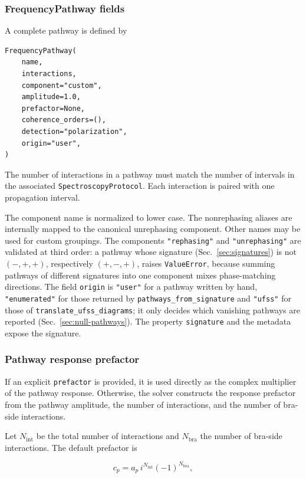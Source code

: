 \documentclass[11pt]{article}
\begin{document}
\subsubsection{FrequencyPathway fields}

A complete pathway is defined by

\begin{verbatim}
FrequencyPathway(
    name,
    interactions,
    component="custom",
    amplitude=1.0,
    prefactor=None,
    coherence_orders=(),
    detection="polarization",
    origin="user",
)
\end{verbatim}

The number of interactions in a pathway must match the number of intervals in the associated \texttt{SpectroscopyProtocol}. Each interaction is paired with one propagation interval.

The component name is normalized to lower case. The nonrephasing aliases are internally mapped to the canonical unrephasing component. Other names may be used for custom groupings. The components \texttt{"rephasing"} and \texttt{"unrephasing"} are validated at third order: a pathway whose signature (Sec.~\ref{sec:signatures}) is not $(-,+,+)$, respectively $(+,-,+)$, raises \texttt{ValueError}, because summing pathways of different signatures into one component mixes phase-matching directions. The field \texttt{origin} is \texttt{"user"} for a pathway written by hand, \texttt{"enumerated"} for those returned by \texttt{pathways\_from\_signature} and \texttt{"ufss"} for those of \texttt{translate\_ufss\_diagrams}; it only decides which vanishing pathways are reported (Sec.~\ref{sec:null-pathways}). The property \texttt{signature} and the metadata expose the signature.


\subsubsection{Pathway response prefactor}

If an explicit \texttt{prefactor} is provided, it is used directly as the complex multiplier of the pathway response. Otherwise, the solver constructs the response prefactor from the pathway amplitude, the number of interactions, and the number of bra-side interactions.

Let \(N_{\mathrm{int}}\) be the total number of interactions and \(N_{\mathrm{bra}}\) the number of bra-side interactions. The default
prefactor is

\begin{equation}
c_p = a_p\, i^{N_{\mathrm{int}}} (-1)^{N_{\mathrm{bra}}},
\end{equation}
\end{document}
